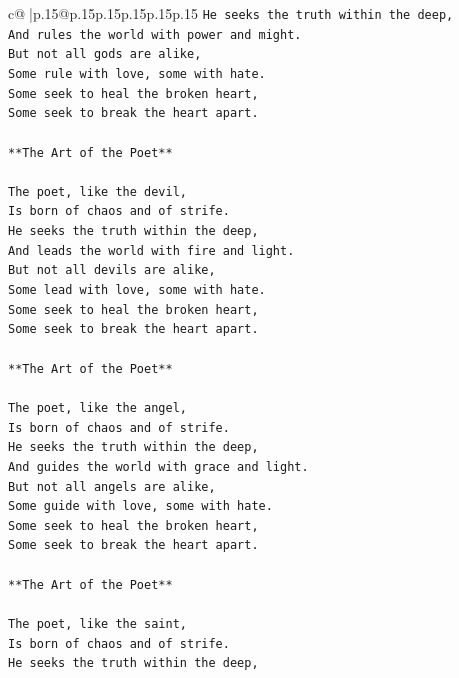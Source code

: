 \documentclass{article}
\begin{document}
{\begin{supertabular}{c@{$\;$}|p{.15\linewidth}@{}p{.15\linewidth}p{.15\linewidth}p{.15\linewidth}p{.15\linewidth}p{.15\linewidth}}
{{{\texttt{He seeks the truth within the deep,} \\
\texttt{And rules the world with power and might.} \\
\texttt{But not all gods are alike,} \\
\texttt{Some rule with love, some with hate.} \\
\texttt{Some seek to heal the broken heart,} \\
\texttt{Some seek to break the heart apart.} \\
\\ 
\texttt{**The Art of the Poet**} \\
\\ 
\texttt{The poet, like the devil,} \\
\texttt{Is born of chaos and of strife.} \\
\texttt{He seeks the truth within the deep,} \\
\texttt{And leads the world with fire and light.} \\
\texttt{But not all devils are alike,} \\
\texttt{Some lead with love, some with hate.} \\
\texttt{Some seek to heal the broken heart,} \\
\texttt{Some seek to break the heart apart.} \\
\\ 
\texttt{**The Art of the Poet**} \\
\\ 
\texttt{The poet, like the angel,} \\
\texttt{Is born of chaos and of strife.} \\
\texttt{He seeks the truth within the deep,} \\
\texttt{And guides the world with grace and light.} \\
\texttt{But not all angels are alike,} \\
\texttt{Some guide with love, some with hate.} \\
\texttt{Some seek to heal the broken heart,} \\
\texttt{Some seek to break the heart apart.} \\
\\ 
\texttt{**The Art of the Poet**} \\
\\ 
\texttt{The poet, like the saint,} \\
\texttt{Is born of chaos and of strife.} \\
\texttt{He seeks the truth within the deep,} \\
}}}
\end{supertabular}}
\end{document}
